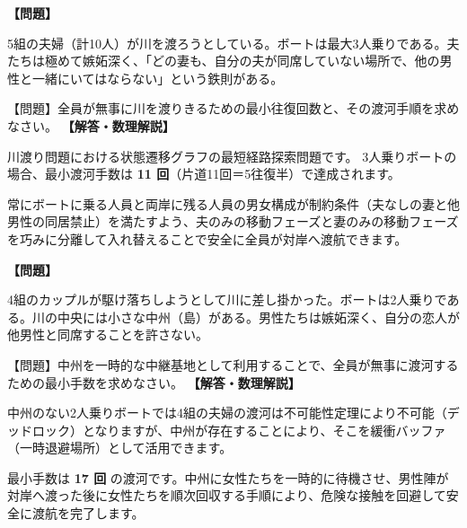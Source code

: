\documentclass[10pt,a4paper,oneside,openany]{ltjsbook}
\begin{document}
\begin{tcolorbox}[colback=softblue,colframe=primaryblue,title=\textbf{第 375 問：五人の嫉妬深い夫の川渡り （原題: FIVE JEALOUS HUSBANDS.）},arc=2mm,boxrule=1pt,breakable]
\textbf{【問題】}\par\vspace{0.3em}
5組の夫婦（計10人）が川を渡ろうとしている。ボートは最大3人乗りである。夫たちは極めて嫉妬深く、「どの妻も、自分の夫が同席していない場所で、他の男性と一緒にいてはならない」という鉄則がある。

【問題】全員が無事に川を渡りきるための最小往復回数と、その渡河手順を求めなさい。
\tcblower
\textbf{【解答・数理解説】}\par\vspace{0.3em}
川渡り問題における状態遷移グラフの最短経路探索問題です。
3人乗りボートの場合、最小渡河手数は \textbf{11 回}（片道11回＝5往復半）で達成されます。

常にボートに乗る人員と両岸に残る人員の男女構成が制約条件（夫なしの妻と他男性の同居禁止）を満たすよう、夫のみの移動フェーズと妻のみの移動フェーズを巧みに分離して入れ替えることで安全に全員が対岸へ渡航できます。
\end{tcolorbox}

\begin{tcolorbox}[colback=softblue,colframe=primaryblue,title=\textbf{第 376 問：四組の駆け落ち（島を経由する川渡り） （原題: THE FOUR ELOPEMENTS.）},arc=2mm,boxrule=1pt,breakable]
\textbf{【問題】}\par\vspace{0.3em}
4組のカップルが駆け落ちしようとして川に差し掛かった。ボートは2人乗りである。川の中央には小さな中州（島）がある。男性たちは嫉妬深く、自分の恋人が他男性と同席することを許さない。

【問題】中州を一時的な中継基地として利用することで、全員が無事に渡河するための最小手数を求めなさい。
\tcblower
\textbf{【解答・数理解説】}\par\vspace{0.3em}
中州のない2人乗りボートでは4組の夫婦の渡河は不可能性定理により不可能（デッドロック）となりますが、中州が存在することにより、そこを緩衝バッファ（一時退避場所）として活用できます。

最小手数は \textbf{17 回} の渡河です。中州に女性たちを一時的に待機させ、男性陣が対岸へ渡った後に女性たちを順次回収する手順により、危険な接触を回避して安全に渡航を完了します。
\end{tcolorbox}
\end{document}
